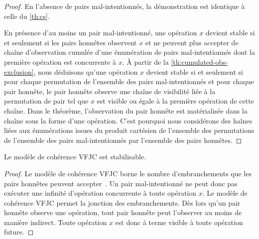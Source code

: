 \begin{proof}
En l'absence de pairs mal-intentionnés, la démonstration est identique à celle du \autoref{th:cs}.

En présence d'au moins un pair mal-intentionné, une opération $x$ devient stable si et seulement si les pairs honnêtes observent $x$ et ne peuvent plus accepter de chaîne d'observation cumulée d'une énumération de pairs mal-intentionnés dont la première opération est concurrente à $x$.
À partir de la \autoref{th:cumulated-obs-exclusion}, nous déduisons qu'une opération $x$ devient stable si et seulement si pour chaque permutation de l'ensemble des pairs mal-intentionnés et pour chaque pair honnête, le pair honnête observe une chaîne de visibilité liée à la permutation de pair tel que $x$ est visible ou égale à la première opération de cette chaîne.
Dans le théorème, l'observation du pair honnête est matérialisée dans la chaîne sous la forme d'une opération.
C'est pourquoi nous considérons des haînes liées aux énumérations issues du produit cartésien de l'ensemble des permutations de l'ensemble des pairs mal-intentionnés par l'ensemble des pairs honnêtes.
\end{proof}




\begin{theorem}\label{th:stabilizable-vfjc}
Le modèle de cohérence \ac{VFJC} est stabilisable.
\end{theorem}

\begin{proof}
Le modèle de cohérence \ac{VFJC} borne le nombre d'embranchements que les pairs honnêtes peuvent accepter~\autocite{mahajan_2011_cac}.
Un pair mal-intentionné ne peut donc pas exécuter une infinité d'opération concurrente à toute opération $x$.
Le modèle de cohérence \ac{VFJC} permet la jonction des embranchements.
Dès lors qu'un pair honnête observe une opération, tout pair honnête peut l'observer au moins de manière indirect.
Toute opération $x$ est donc à terme visible à toute opération future.
\end{proof}

